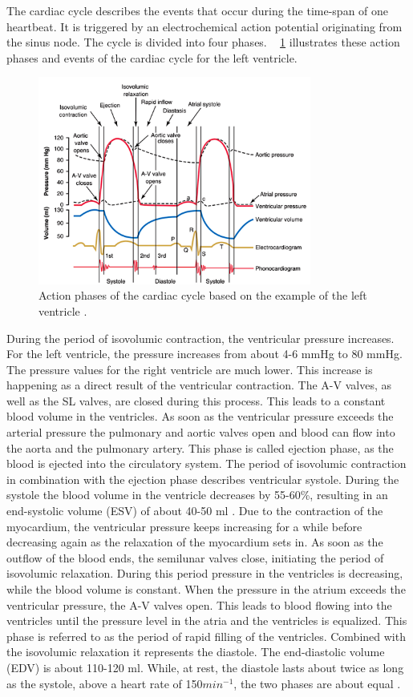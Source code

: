 The cardiac cycle describes the events that occur during the time-span of one heartbeat. It is triggered by an electrochemical action potential originating from the sinus node. The cycle is divided into four phases. \figurename~ \ref{fig:cardiac_cycle} illustrates these action phases and events of the cardiac cycle for the left ventricle.
\begin{figure}[h]
  \centering
  \includegraphics[width=0.8\textwidth]{images/cardiac_cycle.jpg}
  \caption{Action phases of the cardiac cycle based on the example of the left ventricle \cite{GH20}.}
  \label{fig:cardiac_cycle}
\end{figure}
During the period of isovolumic contraction, the ventricular pressure increases. For the left ventricle, the pressure increases from about 4-6 mmHg to 80 mmHg. The pressure values for the right ventricle are much lower. This increase is happening as a direct result of the ventricular contraction. The A-V valves, as well as the SL valves, are closed during this process. This leads to a constant blood volume in the ventricles. As soon as the ventricular pressure exceeds the arterial pressure the pulmonary and aortic valves open and blood can flow into the aorta and the pulmonary artery. This phase is called ejection phase, as the blood is ejected into the circulatory system. The period of isovolumic contraction in combination with the ejection phase describes ventricular systole.\cite{HKS4} During the systole the blood volume in the ventricle decreases by 55-60\%, resulting in an end-systolic volume (ESV) of about 40-50 ml \cite{GH20}. Due to the contraction of the myocardium, the ventricular pressure keeps increasing for a while before decreasing again as the relaxation of the myocardium sets in. As soon as the outflow of the blood ends, the semilunar valves close, initiating the period of isovolumic relaxation. During this period pressure in the ventricles is decreasing, while the blood volume is constant. When the pressure in the atrium exceeds the ventricular pressure, the A-V valves open. This leads to blood flowing into the ventricles until the pressure level in the atria and the ventricles is equalized.\cite{HKS4} This phase is referred to as the period of rapid filling of the ventricles. Combined with the isovolumic relaxation it represents the diastole. The end-diastolic volume (EDV) is about 110-120 ml.\cite{GH20} While, at rest, the diastole lasts about twice as long as the systole, above a heart rate of 150$min^{-1}$, the two phases are about equal \cite{HKS4}.

